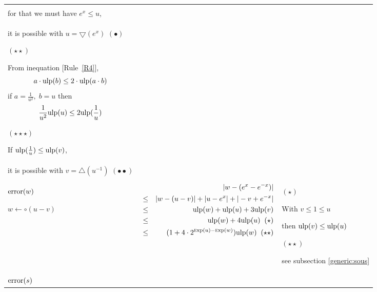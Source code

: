 \documentclass[12pt]{amsart}
\def\pinf{\bigtriangleup}
\def\minf{\bigtriangledown}
\def\ulp{{\rm ulp}}
\def\Exp{{\rm \textsc exp}}
\newcommand{\U}[1]{\quad \mbox{[Rule~\ref{#1}]}}
\begin{document}
\begin{center}
\begin{tabular}{l l l}
\begin{minipage}{7.5cm}
\end{minipage} &
\begin{minipage}{6cm}

$(\star)$

With $\frac{1}{u} \leq \frac{1}{e^x}$,\\
for that we must have $e^x \leq u$,\\
it is possible with $u=\minf(e^x)$ $(\bullet)$

$(\star\star)$

From inequation \U{R4},
\[   a \cdot \ulp(b) \leq 2 \cdot \ulp(a \cdot b)\]
if $a =\frac{1}{u^2},\;b = u$ then
\[ \frac{1}{u^2} \ulp(u)  \leq 2 \ulp(\frac{1}{u})\]

$(\star\star\star)$

If $\ulp(\frac{1}{u}) \leq \ulp(v)$,\\
it is possible with $v=\pinf(u^{-1})$ $(\bullet\bullet)$



\end{minipage}\\%
\begin{minipage}{2.5cm}
${\textnormal{error}}(w)$


$w \leftarrow \circ(u-v) $
\end{minipage} &
\begin{minipage}{7.8cm}



\begin{eqnarray}\nonumber
  &&|w-(e^{x}-e^{-x})| \\\nonumber
  &       \leq&  |w - (u-v)|+|u - e^x|+|-v + e^{-x}|\\\nonumber
  &       \leq& \ulp(w) + \ulp(u) + 3\ulp(v)\\\nonumber
  &       \leq& \ulp(w) + 4\ulp(u)\;\;(\star)\\\nonumber
  &       \leq& (1+ 4 \cdot 2^{\Exp(u)-\Exp(w)}) \ulp(w)\;\;(\star\star)\\\nonumber
\end{eqnarray}


\end{minipage} &
\begin{minipage}{6cm}

$(\star)$

With $v \leq 1\leq u$

then $\ulp(v) \leq \ulp(u)$

$(\star\star)$

see subsection \ref{generic:sous}

\end{minipage}\\%
\begin{minipage}{2.5cm}
${\textnormal{error}}(s)$


\end{minipage}
\end{tabular}
\end{center}
\end{document}
